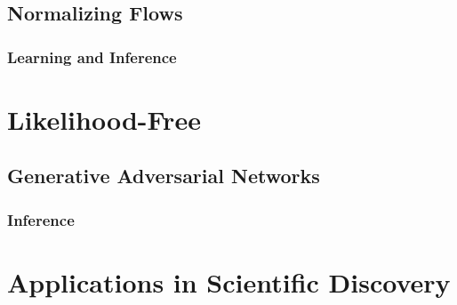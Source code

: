         \subsection{Normalizing Flows} %

            \subsubsection{Learning and Inference} %

    \section{Likelihood-Free} %

        \subsection{Generative Adversarial Networks} %

            \subsubsection{Inference} %

    \section{Applications in Scientific Discovery} %
